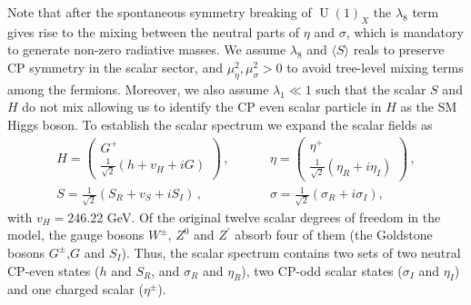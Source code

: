 \documentclass[12pt]{article}
\begin{document}
Note that after the spontaneous symmetry breaking of $\operatorname{U}(1)_X$ the $\lambda_8$ term gives rise to the mixing between the neutral parts of $\eta$ and $\sigma$, which is mandatory to generate non-zero radiative masses. 
We assume $\lambda_8$ and $\langle S\rangle$ reals to preserve CP symmetry in the scalar sector, and $\mu^2_\eta,\mu^2_\sigma>0$ to avoid tree-level mixing terms among the fermions. 
Moreover, we also assume $\lambda_1\ll1$  such that the scalar $S$ and $H$ do not mix allowing us to identify the CP even scalar particle in $H$ as the SM Higgs boson. 
To establish the scalar spectrum we expand the scalar fields as
%
\begin{align*}
  H = \begin{pmatrix}G^+ \\ \frac{1}{\sqrt{2}} (h+v_H+iG) \end{pmatrix} \,,&\hspace{1cm}
  \eta = \begin{pmatrix}\eta^{+} \\ \frac{1}{\sqrt{2}}(\eta_R+i\eta_I) \end{pmatrix} \,,\\
  S = \frac{1}{\sqrt{2}} (S_R+v_{S}+iS_I)\,,&\hspace{1cm}\sigma = \frac{1}{\sqrt{2}} (\sigma_R+i\sigma_I),
\end{align*}
%
with $v_H= 246.22$ GeV.  
%
%
Of the original twelve scalar degrees of freedom in the model, the gauge bosons $W^{\pm}$, $Z^{0}$ and $Z^{\prime}$ absorb four of them (the Goldstone bosons $G^{\pm}$,$G$ and $S_{I}$). Thus, the scalar spectrum contains two sets of two neutral CP-even states ($h$ and $S_{R}$,  and $\sigma_{R}$ and $\eta_{R}$), two CP-odd scalar states ($\sigma_{I}$ and $\eta_{I}$) and one charged scalar ($\eta^{\pm}$). 
\end{document}
